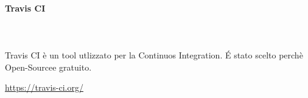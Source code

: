 		\paragraph{Travis CI} \mbox{}\\ \mbox{}\\
		Travis CI è un tool utlizzato per la Continuos Integration\glo. \'E stato scelto perchè Open-Source\glosp e gratuito.
		\newline
		\centerline{\url{https://travis-ci.org/}}
		\begin{comment}
			\begin{figure}[H]
			\texttt{[image: res/images/""]}
			\caption{Software per la codifica}
			\end{figure} 
		\end{comment}
